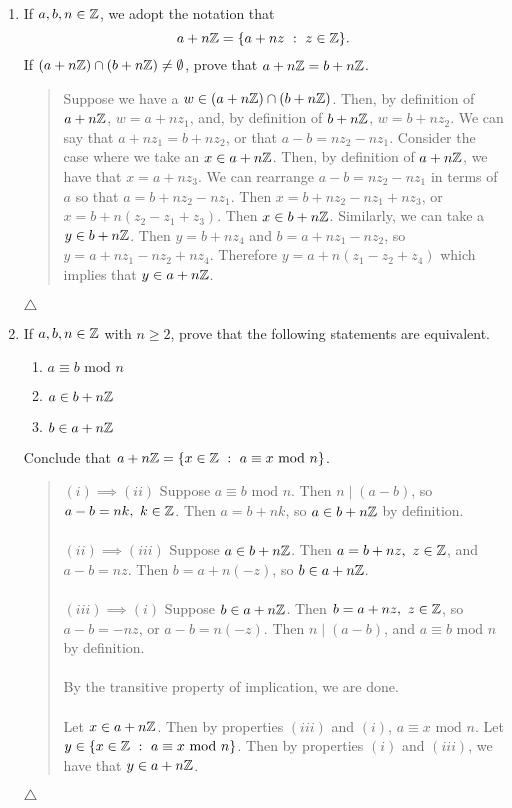 \documentclass{hw}
\begin{document}
\begin{enumerate}
\item If $a,b,n\in\mathbb{Z}$, we adopt the notation that
\[
a+n\ZZ = \{a+nz\ :\ z\in\ZZ\}.
\]
If $(a+n\mathbb{Z})\cap(b+n\mathbb{Z})\neq\emptyset$, prove that $a+n\mathbb{Z} = b+n\mathbb{Z}$.
\begin{quote}
Suppose we have a $w\in(a+n\mathbb{Z})\cap(b+n\mathbb{Z})$. Then, by definition of $a+n\mathbb{Z}$, $w=a+nz_{1}$, and,
by definition of $b+n\mathbb{Z}$, $w=b+nz_{2}$. We can say that $a+nz_{1} = b+nz_{2}$, or that
$a-b=nz_{2}-nz_{1}$. Consider the case where we take an $x\in a+n\mathbb{Z}$. Then, by definition of $a+n\mathbb{Z}$,
we have that $x=a+nz_{3}$. We can rearrange $a-b=nz_{2}-nz_{1}$ in terms of $a$ so that
$a=b+nz_{2}-nz_{1}$. Then $x=b+nz_{2}-nz_{1}+nz_{3}$, or $x=b+n(z_{2}-z_{1}+z_{3})$. Then $x\in b+n\mathbb{Z}$.
Similarly, we can take a $y\in b+n\mathbb{Z}$. Then $y=b+nz_{4}$ and $b=a+nz_{1}-nz_{2}$, so
$y=a+nz_{1}-nz_{2}+nz_{4}$. Therefore $y=a+n(z_{1}-z_{2}+z_{4})$ which implies that $y\in a+n\mathbb{Z}$.
\end{quote}
$\triangle$

\item If $a, b, n\in\mathbb{Z}$ with $n\geq 2$, prove that the following statements are equivalent.
\begin{enumerate}[i]
\item $a\equiv b\text{ mod }n$
\item $a\in b+n\mathbb{Z}$
\item $b\in a+n\mathbb{Z}$
\end{enumerate}
Conclude that $a+n\mathbb{Z}=\{x\in\mathbb{Z}\ :\ a\equiv x\text{ mod }n\}$.
\begin{quote}
\underline{$(i)\implies(ii)$} Suppose $a\equiv b\text{ mod }n$. Then $n\mid(a-b)$, so $a-b=nk,\ k\in\mathbb{Z}$.
Then $a=b+nk$, so $a\in b+n\mathbb{Z}$ by definition.\\\\
\underline{$(ii)\implies(iii)$} Suppose $a\in b+n\mathbb{Z}$. Then $a=b+nz,\ z\in\mathbb{Z}$, and $a-b=nz$. Then
$b=a+n(-z)$, so $b\in a+n\mathbb{Z}$.\\\\
\underline{$(iii)\implies(i)$} Suppose $b\in a+n\mathbb{Z}$. Then $b=a+nz,\ z\in\mathbb{Z}$, so $a-b=-nz$, or
$a-b=n(-z)$. Then $n\mid(a-b)$, and $a\equiv b\text{ mod }n$ by definition.\\\\
By the transitive property of implication, we are done.\\\\
Let $x\in a+n\mathbb{Z}$. Then by properties $(iii)$ and $(i)$, $a\equiv x\text{ mod }n$. Let
$y\in\{ x\in\mathbb{Z}\ :\ a\equiv x\text{ mod }n \}$. Then by properties $(i)$ and $(iii)$, we have that
$y\in a+n\mathbb{Z}$.
\end{quote}
$\triangle$
\end{enumerate}
\end{document}
